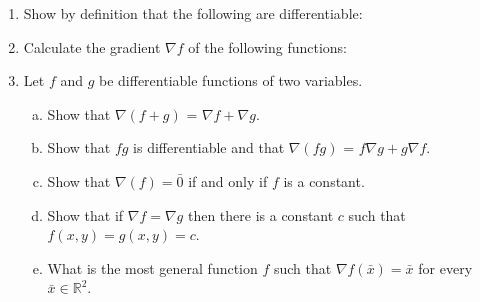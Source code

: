 \documentclass[journal,12pt,twocolumn]{IEEEtran}
\begin{document}
\begin{enumerate}
\begin{enumerate}[(a)]
\end{enumerate}


\item Show by definition that the following are differentiable:

\begin{enumerate}[(i)]
\end{enumerate}

\item Calculate the gradient $\nabla f$ of the following functions:
 
\begin{enumerate}[(i)]
\end{enumerate}


\item Let $f$ and $g$ be differentiable functions of two variables.

\begin{enumerate}[(a)]

\item Show that $ \nabla (f + g)$ = $ \nabla f + \nabla g$.
\item Show that $fg$ is differentiable and that $ \nabla (fg)$ = $ f \nabla g + g \nabla f $.
\item Show that $ \nabla (f) =  \bar{0}$ if and only if $f$ is a constant.
\item Show that if $ \nabla f = \nabla g$ then there is a constant $c$ such that $f(x,y) = g(x,y) = c$.
\item What is the most general function $f$ such that $ \nabla f(\bar{x}) = \bar{x}$ for every  $ \bar{x} \in \mathbb{R}^2$.


\end{enumerate}
\end{enumerate}
\end{document}
